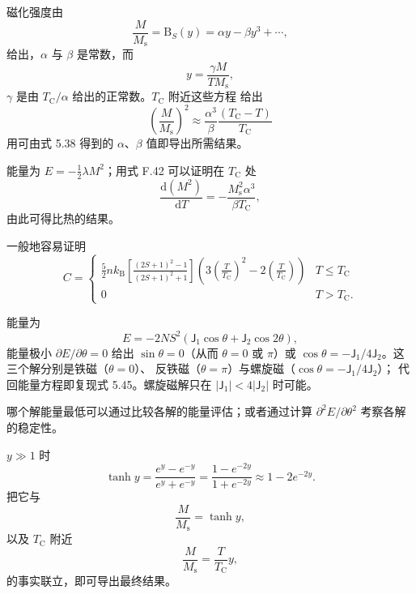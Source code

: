  磁化强度由
\begin{equation*}
\frac{M}{M_{\mathrm{s}}} = \mathrm{B}_S(y) = \alpha y - \beta y^{3}+\cdots,\tag{F.40}
\end{equation*}
给出，$\alpha$ 与 $\beta$ 是常数，而
\begin{equation*}
y = \frac{\gamma M}{TM_{\mathrm{s}}},\tag{F.41}
\end{equation*}
$\gamma$ 是由 $T_{\mathrm{C}}/\alpha$ 给出的正常数。$T_{\mathrm{C}}$ 附近这些方程
给出
\begin{equation*}
\left(\frac{M}{M_{\mathrm{s}}}\right)^{2} \approx \frac{\alpha^{3}}{\beta}\frac{(T_{\mathrm{C}}-T)}{T_{\mathrm{C}}}\tag{F.42}
\end{equation*}
用可由式 5.38 得到的 $\alpha$、$\beta$ 值即导出所需结果。

能量为 $E=-\frac{1}{2}\lambda M^{2}$；用式 F.42 可以证明在 $T_{\mathrm{C}}$ 处
\begin{equation*}
\frac{\mathrm{d}(M^{2})}{\mathrm{d}T} = -\frac{M_{\mathrm{s}}^{2}\alpha^{3}}{\beta T_{\mathrm{C}}},\tag{F.43}
\end{equation*}
由此可得比热的结果。

一般地容易证明
\begin{equation*}
C = \begin{cases} \frac{5}{2}nk_{\mathrm{B}}\left[\frac{(2S+1)^{2}-1}{(2S+1)^{2}+1}\right]\left(3\left(\frac{T}{T_{\mathrm{C}}}\right)^{2}-2\left(\frac{T}{T_{\mathrm{C}}}\right)\right) & T\leq T_{\mathrm{C}}\\ 0 & T>T_{\mathrm{C}}. \end{cases}\tag{F.44}
\end{equation*}

 能量为
\begin{equation*}
E = -2NS^{2}(\mathsf{J}_1\cos\theta + \mathsf{J}_2\cos2\theta),\tag{F.45}
\end{equation*}
能量极小 $\partial E/\partial\theta=0$ 给出 $\sin\theta=0$（从而 $\theta=0$ 或
$\pi$）或 $\cos\theta=-\mathsf{J}_1/4\mathsf{J}_2$。这三个解分别是铁磁（$\theta=0$）、
反铁磁（$\theta=\pi$）与螺旋磁（$\cos\theta=-\mathsf{J}_1/4\mathsf{J}_2$）；
代回能量方程即复现式 5.45。螺旋磁解只在 $|\mathsf{J}_1|<4|\mathsf{J}_2|$ 时可能。

哪个解能量最低可以通过比较各解的能量评估；或者通过计算 $\partial^{2}E/\partial\theta^{2}$
考察各解的稳定性。

 $y\gg1$ 时
\begin{equation*}
\tanh y = \frac{e^{y}-e^{-y}}{e^{y}+e^{-y}} = \frac{1-e^{-2y}}{1+e^{-2y}} \approx 1-2e^{-2y}.\tag{F.46}
\end{equation*}
把它与
\begin{equation*}
\frac{M}{M_{\mathrm{s}}} = \tanh y,\tag{F.47}
\end{equation*}
以及 $T_{\mathrm{C}}$ 附近
\begin{equation*}
\frac{M}{M_{\mathrm{s}}} = \frac{T}{T_{\mathrm{C}}}y,\tag{F.48}
\end{equation*}
的事实联立，即可导出最终结果。

